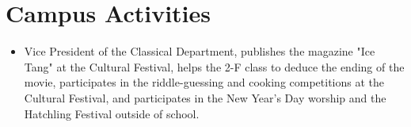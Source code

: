 \documentclass{resume}
\begin{document}
\section{\texorpdfstring{\faInfo}{} Campus Activities}
\begin{itemize}[parsep=0.5ex]
  \item Vice President of the Classical Department, publishes the magazine "Ice Tang" at the Cultural Festival, helps the 2-F class to deduce the ending of the movie, participates in the riddle-guessing and cooking competitions at the Cultural Festival, and participates in the New Year's Day worship and the Hatchling Festival outside of school.
\end{itemize}
\end{document}
